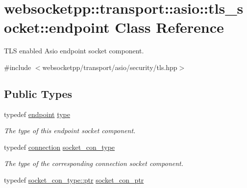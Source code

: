 \hypertarget{classwebsocketpp_1_1transport_1_1asio_1_1tls__socket_1_1endpoint}{}\section{websocketpp\+:\+:transport\+:\+:asio\+:\+:tls\+\_\+socket\+:\+:endpoint Class Reference}
\label{classwebsocketpp_1_1transport_1_1asio_1_1tls__socket_1_1endpoint}


T\+L\+S enabled Asio endpoint socket component.  




{\ttfamily \#include $<$websocketpp/transport/asio/security/tls.\+hpp$>$}

\subsection*{Public Types}
\begin{DoxyCompactItemize}
\item 
typedef \hyperlink{classwebsocketpp_1_1transport_1_1asio_1_1tls__socket_1_1endpoint}{endpoint} \hyperlink{classwebsocketpp_1_1transport_1_1asio_1_1tls__socket_1_1endpoint_adc98054310e74703eb102760e85f5cd9}{type}
\begin{DoxyCompactList}\small\item\em The type of this endpoint socket component. \end{DoxyCompactList}\item 
typedef \hyperlink{classwebsocketpp_1_1transport_1_1asio_1_1tls__socket_1_1connection}{connection} \hyperlink{classwebsocketpp_1_1transport_1_1asio_1_1tls__socket_1_1endpoint_a690393b3da13e389cf025f88a3d38f3f}{socket\+\_\+con\+\_\+type}
\begin{DoxyCompactList}\small\item\em The type of the corresponding connection socket component. \end{DoxyCompactList}\item 
typedef \hyperlink{classwebsocketpp_1_1transport_1_1asio_1_1tls__socket_1_1connection_a2aa605c27a476eba644e062dc5bc4f6d}{socket\+\_\+con\+\_\+type\+::ptr} \hyperlink{classwebsocketpp_1_1transport_1_1asio_1_1tls__socket_1_1endpoint_ad0babd14e53524633840467d072710c3}{socket\+\_\+con\+\_\+ptr}
\end{DoxyCompactItemize}
